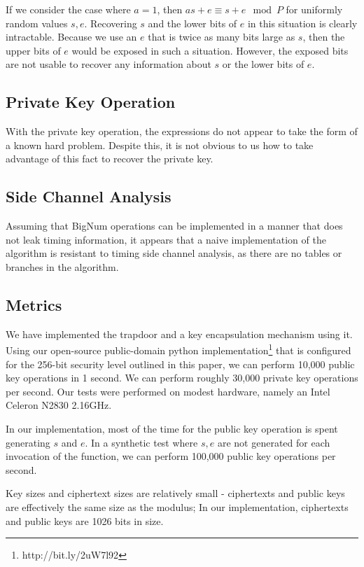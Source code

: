 \documentclass[preprint]{iacrtrans}
\begin{document}
If we consider the case where $a = 1$, then $a s + e \equiv s + e \mod P$ for uniformly random values $s, e$. Recovering $s$ and the lower bits of $e$ in this situation is clearly intractable. Because we use an $e$ that is twice as many bits large as $s$, then the upper bits of $e$ would be exposed in such a situation. However, the exposed bits are not usable to recover any information about $s$ or the lower bits of $e$.

\subsection{Private Key Operation}
With the private key operation, the expressions do not appear to take the form of a known hard problem. Despite this, it is not obvious to us how to take advantage of this fact to recover the private key. 

\subsection{Side Channel Analysis}
Assuming that BigNum operations can be implemented in a manner that does not leak timing information, it appears that a naive implementation of the algorithm is resistant to timing side channel analysis, as there are no tables or branches in the algorithm.

\subsection{Metrics}
We have implemented the trapdoor and a key encapsulation mechanism using it. Using our open-source public-domain python implementation\footnote{http://bit.ly/2uW7l92} that is configured for the 256-bit security level outlined in this paper, we can perform 10,000 public key operations in 1 second. We can perform roughly 30,000 private key operations per second. Our tests were performed on modest hardware, namely an Intel Celeron N2830 2.16GHz. 

In our implementation, most of the time for the public key operation is spent generating $s$ and $e$. In a synthetic test where $s, e$ are not generated for each invocation of the function, we can perform 100,000 public key operations per second.

Key sizes and ciphertext sizes are relatively small - ciphertexts and public keys are effectively the same size as the modulus; In our implementation, ciphertexts and public keys are 1026 bits in size.
\end{document}
